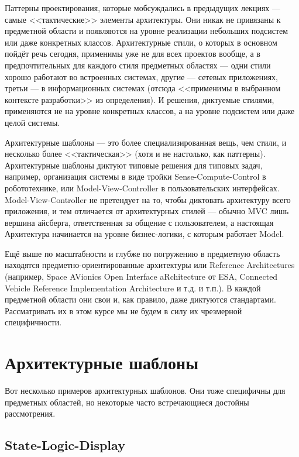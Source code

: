 \documentclass[a5paper]{article}
\begin{document}
Паттерны проектирования, которые мобсуждались в предыдущих лекциях --- самые <<тактические>> элементы архитектуры. Они никак не привязаны к предметной области и появляются на уровне реализации небольших подсистем или даже конкретных классов. Архитектурные стили, о которых в основном пойдёт речь сегодня, применимы уже не для всех проектов вообще, а в предпочтительных для каждого стиля предметных областях --- одни стили хорошо работают во встроенных системах, другие --- сетевых приложениях, третьи --- в информационных системах (отсюда <<применимы в выбранном контексте разработки>> из определения). И решения, диктуемые стилями, применяются не на уровне конкретных классов, а на уровне подсистем или даже целой системы.

Архитектурные шаблоны --- это более специализированная вещь, чем стили, и несколько более <<тактическая>> (хотя и не настолько, как паттерны). Архитектурные шаблоны диктуют типовые решения для типовых задач, например, организация системы в виде тройки Sense-Compute-Control в робототехнике, или Model-View-Controller в пользовательских интерфейсах. Model-View-Controller не претендует на то, чтобы диктовать архитектуру всего приложения, и тем отличается от архитектурных стилей --- обычно MVC лишь вершина айсберга, ответственная за общение с пользователем, а настоящая Архитектура начинается на уровне бизнес-логики, с которым работает Model.

Ещё выше по масштабности и глубже по погружению в предметную область находятся предметно-ориентированные архитектуры или Reference Architectures (например, Space AVionics Open Interface aRchitecture от ESA, Connected Vehicle Reference Implementation Architecture и т.д. и т.п.). В каждой предметной области они свои и, как правило, даже диктуются стандартами. Рассматривать их в этом курсе мы не будем в силу их чрезмерной специфичности.

\section{Архитектурные шаблоны}

Вот несколько примеров архитектурных шаблонов. Они тоже специфичны для предметных областей, но некоторые часто встречающиеся достойны рассмотрения.

\subsection{State-Logic-Display}
\end{document}
